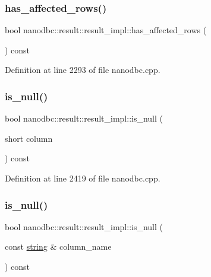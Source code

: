 \subsubsection{\texorpdfstring{has\_affected\_rows()}{has\_affected\_rows()}}
{\footnotesize\ttfamily bool nanodbc\+::result\+::result\+\_\+impl\+::has\+\_\+affected\+\_\+rows (\begin{DoxyParamCaption}{ }\end{DoxyParamCaption}) const\hspace{0.3cm}{\ttfamily [inline]}}



Definition at line 2293 of file nanodbc.\+cpp.

\mbox{\label{classnanodbc_1_1result_1_1result__impl_ab2f4f63b88a52c826875fdc55a802107}} 
\subsubsection{\texorpdfstring{is\_null()}{is\_null()}\hspace{0.1cm}{\footnotesize\ttfamily [1/2]}}
{\footnotesize\ttfamily bool nanodbc\+::result\+::result\+\_\+impl\+::is\+\_\+null (\begin{DoxyParamCaption}\item[{short}]{column }\end{DoxyParamCaption}) const\hspace{0.3cm}{\ttfamily [inline]}}



Definition at line 2419 of file nanodbc.\+cpp.

\mbox{\label{classnanodbc_1_1result_1_1result__impl_a1611e6eac2aa51139d6abc1e3031c38f}} 
\subsubsection{\texorpdfstring{is\_null()}{is\_null()}\hspace{0.1cm}{\footnotesize\ttfamily [2/2]}}
{\footnotesize\ttfamily bool nanodbc\+::result\+::result\+\_\+impl\+::is\+\_\+null (\begin{DoxyParamCaption}\item[{const \mbox{\hyperlink{namespacenanodbc_abfc0ece56278e590911ec8352774c212}{string}} \&}]{column\+\_\+name }\end{DoxyParamCaption}) const\hspace{0.3cm}{\ttfamily [inline]}}



